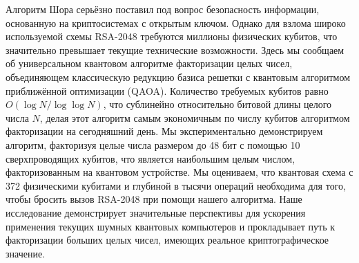 
Алгоритм Шора серьёзно поставил под вопрос безопасность информации, основанную
на криптосистемах с открытым ключом. Однако для взлома широко используемой
схемы RSA-2048 требуются миллионы физических кубитов, что значительно превышает
текущие технические возможности. Здесь мы сообщаем об универсальном квантовом
алгоритме факторизации целых чисел, объединяющем классическую редукцию базиса
решетки с квантовым алгоритмом приближённой оптимизации (QAOA). Количество
требуемых кубитов равно $O(\log N / \log\log N)$, что сублинейно относительно
битовой длины целого числа $N$, делая этот алгоритм самым экономичным по числу
кубитов алгоритмом факторизации на сегодняшний день. Мы экспериментально
демонстрируем алгоритм, факторизуя целые числа размером до 48 бит с помощью 10
сверхпроводящих кубитов, что является наибольшим целым числом, факторизованным
на квантовом устройстве. Мы оцениваем, что квантовая схема с 372 физическими
кубитами и глубиной в тысячи операций необходима для того, чтобы бросить вызов
RSA-2048 при помощи нашего алгоритма. Наше исследование демонстрирует
значительные перспективы для ускорения применения текущих шумных квантовых
компьютеров и прокладывает путь к факторизации больших целых чисел, имеющих
реальное криптографическое значение.
